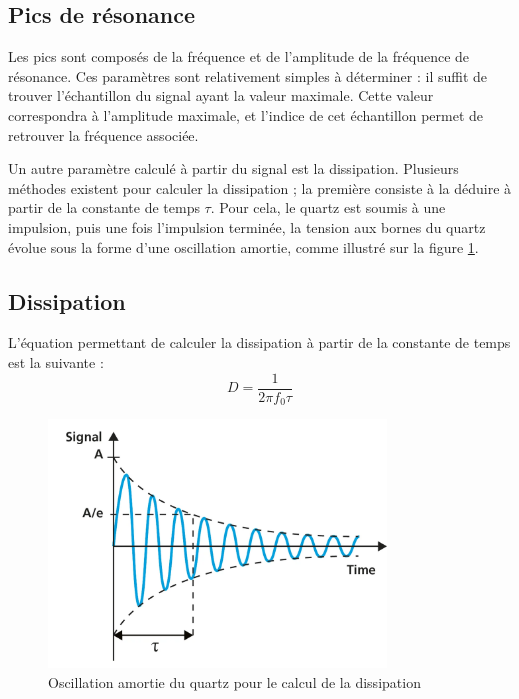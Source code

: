 \subsection{Pics de résonance}

Les pics sont composés de la fréquence et de l'amplitude de la fréquence de résonance.  
Ces paramètres sont relativement simples à déterminer : il suffit de trouver l’échantillon du signal ayant la valeur maximale. Cette valeur correspondra à l'amplitude maximale, et l'indice de cet échantillon permet de retrouver la fréquence associée.

Un autre paramètre calculé à partir du signal est la dissipation.  
Plusieurs méthodes existent pour calculer la dissipation ; la première consiste à la déduire à partir de la constante de temps $\tau$.  
Pour cela, le quartz est soumis à une impulsion, puis une fois l'impulsion terminée, la tension aux bornes du quartz évolue sous la forme d'une oscillation amortie, comme illustré sur la figure \ref{fig:DissipationTAU}.

\subsection{Dissipation}

L'équation permettant de calculer la dissipation à partir de la constante de temps \cite{Edvardsson2024Dissipation} est la suivante :
\begin{equation}
    D = \frac{1}{2\pi f_0 \tau}
    \label{eq:Dissipation}
\end{equation}

\begin{figure}[H]
    \centering
    \includegraphics[width=0.8\textwidth]{assets/figures/Dissipation TAU.png}
    \caption{Oscillation amortie du quartz pour le calcul de la dissipation \cite{Edvardsson2024Dissipation}}
    \label{fig:DissipationTAU}
\end{figure}


